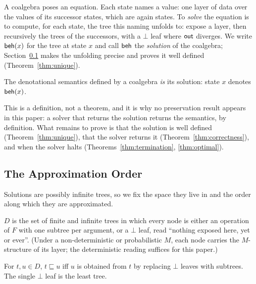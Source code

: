 A coalgebra poses an equation. Each state names a value: one layer of data over the values of
its successor states, which are again states. To \emph{solve} the equation is to compute, for
each state, the tree this naming unfolds to: expose a layer, then recursively the trees of the
successors, with a $\bot$ leaf where $\mathsf{out}$ diverges. We write $\mathsf{beh}(x)$ for the tree at
state $x$ and call $\mathsf{beh}$ the \emph{solution} of the coalgebra; Section~\ref{sec:order} makes
the unfolding precise and proves it well defined (Theorem~\ref{thm:unique}).

\begin{definition}\label{def:semantics}
  The denotational semantics defined by a coalgebra \emph{is} its solution: state $x$ denotes
  $\mathsf{beh}(x)$.
\end{definition}

\noindent
This is a definition, not a theorem, and it is why no preservation result appears in this
paper: a solver that returns the solution returns the semantics, by definition. What remains
to prove is that the solution is well defined (Theorem~\ref{thm:unique}), that the solver
returns it (Theorem~\ref{thm:correctness}), and when the solver halts
(Theorems~\ref{thm:termination}, \ref{thm:optimal}).

\subsection{The Approximation Order}\label{sec:order}

Solutions are possibly infinite trees, so we fix the space they live in and the order along
which they are approximated.

\begin{definition}[Trees]\label{def:trees}
  $D$ is the set of finite and infinite trees in which every node is either an operation of
  $F$ with one subtree per argument, or a $\bot$ leaf, read ``nothing exposed here, yet or
  ever''. (Under a non-deterministic or probabilistic $M$, each node carries the
  $M$-structure of its layer; the deterministic reading suffices for this paper.)
\end{definition}

\begin{definition}\label{def:order}
  For $t, u \in D$, $t \sqsubseteq u$ iff $u$ is obtained from $t$ by replacing $\bot$ leaves
  with subtrees. The single $\bot$ leaf is the least tree.
\end{definition}

